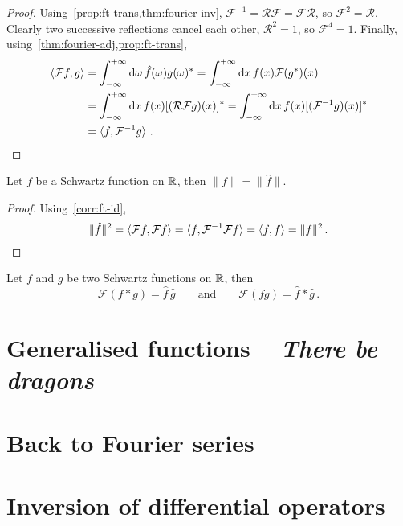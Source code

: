 \begin{proof}
  Using~\cref{prop:ft-trans,thm:fourier-inv},
  $\mathcal{F}^{-1}=\mathcal{R}\mathcal{F}=\mathcal{F}\mathcal{R}$, so
  $\mathcal{F}^2=\mathcal{R}$. Clearly two successive reflections cancel each other, \ie
  $\mathcal{R}^2=1$, so $\mathcal{F}^4=1$. Finally,
  using~\cref{thm:fourier-adj,prop:ft-trans},
  \begin{align}
    \braket{\mathcal{F}f,g}&=\int_{-\infty}^{+\infty}\mathrm{d}{\omega}\,\hat{f}(\omega)g(\omega)^*
    =\int_{-\infty}^{+\infty}\mathrm{d}{x}\,f(x)\mathcal{F}(g^*)(x)\\
    &=\int_{-\infty}^{+\infty}\mathrm{d}{x}\,f(x)[(\mathcal{R}\mathcal{F}g)(x)]^*
    =\int_{-\infty}^{+\infty}\mathrm{d}{x}\,f(x)[(\mathcal{F}^{-1}g)(x)]^*\\
    &=\braket{f,\mathcal{F}^{-1}g}\,.
  \end{align}
\end{proof}
\begin{theorem}[Plancherel]
  Let $f$ be a Schwartz function on $\mathbb{R}$, then $\|f\|=\|\hat{f}\|$.
\end{theorem}
\begin{proof}
  Using~\cref{corr:ft-id},
  \begin{equation}
    \|\hat{f}\|^2=\braket{\mathcal{F}f,\mathcal{F}f}=\braket{f,\mathcal{F}^{-1}\mathcal{F}f}
    =\braket{f,f}=\|f\|^2\,.
  \end{equation}
\end{proof}
\begin{theorem}
  Let $f$ and $g$ be two Schwartz functions on $\mathbb{R}$, then
  \begin{equation}
    \mathcal{F}(f\ast g)=\hat{f}\,\hat{g}\qquad\text{and}\qquad
    \mathcal{F}(fg)=\hat{f}\ast\hat{g}\,.
  \end{equation}
\end{theorem}
\section{Generalised functions -- \textit{There be dragons}}
\section{Back to Fourier series}
\section{Inversion of differential operators}
